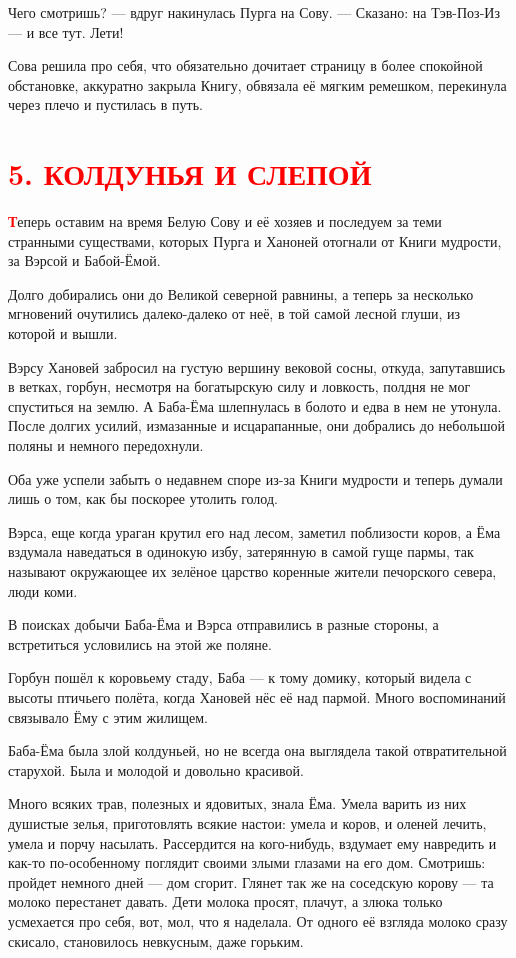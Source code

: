 \documentclass[oneside,final,14pt]{extreport}
\begin{document}
	Чего смотришь? — вдруг накинулась Пурга на Сову. — Сказано: на Тэв-Поз-Из — и все тут. Лети!
	
	Сова решила про себя, что обязательно дочитает страницу в более спокойной обстановке, аккуратно закрыла Книгу, обвязала её мягким ремешком, перекинула через плечо и пустилась в путь.
	
		\section[5. Колдунья и слепой]{\center \textcolor{red}{5. КОЛДУНЬЯ И СЛЕПОЙ}}

	
	\lettrine[findent=0pt]{\textbf{\textcolor{red}{Т}}}{}еперь оставим на время Белую Сову и её хозяев и последуем за теми странными существами, которых Пурга и Ханоней отогнали от Книги мудрости, за Вэрсой и Бабой-Ёмой.
	
	Долго добирались они до Великой северной равнины, а теперь за несколько мгновений очутились далеко-далеко от неё, в той самой лесной глуши, из которой и вышли.
	
	Вэрсу Хановей забросил на густую вершину вековой сосны, откуда, запутавшись в ветках, горбун, несмотря на богатырскую силу и ловкость, полдня не мог спуститься на землю. А Баба-Ёма шлепнулась в болото и едва в нем не утонула. После долгих усилий, измазанные и исцарапанные, они добрались до небольшой поляны и немного передохнули.
	
	Оба уже успели забыть о недавнем споре из-за Книги мудрости и теперь думали лишь о том, как бы поскорее утолить голод.
	
	Вэрса, еще когда ураган крутил его над лесом, заметил поблизости коров, а Ёма вздумала наведаться в одинокую избу, затерянную в самой гуще пармы, так называют окружающее их зелёное царство коренные жители печорского севера, люди коми.
	
	В поисках добычи Баба-Ёма и Вэрса отправились в разные стороны, а встретиться условились на этой же поляне.
	
	Горбун пошёл к коровьему стаду, Баба — к тому домику, который видела с высоты птичьего полёта, когда Хановей нёс её над пармой. Много воспоминаний связывало Ёму с этим жилищем.
	
	Баба-Ёма была злой колдуньей, но не всегда она выглядела такой отвратительной старухой. Была и молодой и довольно красивой.
	
	Много всяких трав, полезных и ядовитых, знала Ёма. Умела варить из них душистые зелья, приготовлять всякие настои: умела и коров, и оленей лечить, умела и порчу насылать. Рассердится на кого-нибудь, вздумает ему навредить и как-то по-особенному поглядит своими злыми глазами на его дом. Смотришь: пройдет немного дней — дом сгорит. Глянет так же на соседскую корову — та молоко перестанет давать. Дети молока просят, плачут, а злюка только усмехается про себя, вот, мол, что я наделала. От одного её взгляда молоко сразу скисало, становилось невкусным, даже горьким.
	
\end{document}
